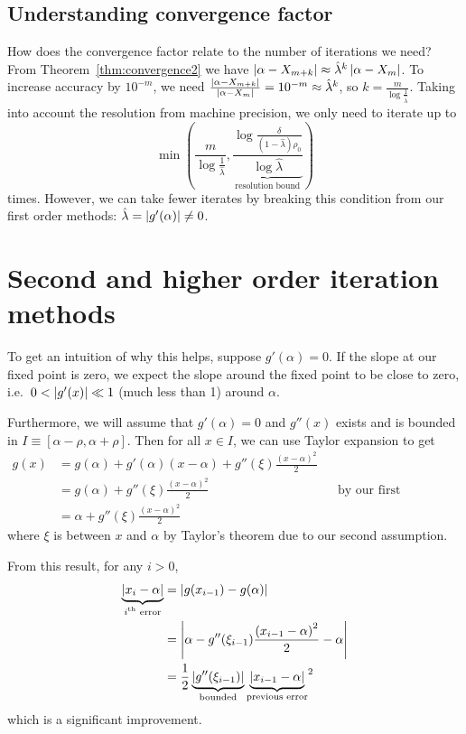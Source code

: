 \documentclass[12pt,letterpaper,DIV=11]{scrartcl}
\theoremstyle{plain}
\theoremstyle{definition}
\theoremstyle{remark}
\begin{document}
\subsection{Understanding convergence factor}
How does the convergence factor relate to the number of iterations we need?
From Theorem~\ref{thm:convergence2} we have $\left\lvert\alpha - X_{m + k}\right\rvert \approx \hat{\lambda}^k \left\lvert\alpha - X_m\right\rvert$.
To increase accuracy by $10^{-m}$, we need $\frac{\left\lvert\alpha - X_{m + k}\right\rvert}{\left\lvert\alpha - X_m\right\rvert} = 10^{-m} \approx \hat{\lambda}^k$, so $k = \frac{m}{\log \frac{1}{\hat{\lambda}}}$.
Taking into account the resolution from machine precision, we only need to iterate up to \begin{displaymath}
  \min\left( \frac{m}{\log \frac{1}{\hat{\lambda}}}, \underbrace{\frac{\log \frac{\delta}{(1 - \hat{\lambda}) \rho_0}}{\log \hat{\lambda}}}_\text{resolution bound} \right)
\end{displaymath} times.
However, we can take fewer iterates by breaking this condition from our first order methods: $\hat{\lambda} = \left\lvert g'(\alpha)\right\rvert \neq 0$.

\section{Second and higher order iteration methods}
To get an intuition of why this helps, suppose $g'(\alpha) = 0$.
If the slope at our fixed point is zero, we expect the slope around the fixed point to be close to zero, i.e.\ $0 < \left\lvert g'(x)\right\rvert \ll 1$ (much less than 1) around $\alpha$.

Furthermore, we will assume that $g'(\alpha) = 0$ and $g''(x)$ exists and is bounded in $I \equiv [\alpha - \rho, \alpha + \rho]$.
Then for all $x \in I$, we can use Taylor expansion to get \begin{align*}
  g(x) &= g(\alpha) + g'(\alpha)(x - \alpha) + g''(\xi) \frac{{(x - \alpha)}^2}{2} \\
       &= g(\alpha) + g''(\xi) \frac{{(x - \alpha)}^2}{2} && \text{by our first assumption} \\
       &= \alpha + g''(\xi) \frac{{(x - \alpha)}^2}{2}
\end{align*} where $\xi$ is between $x$ and $\alpha$ by Taylor's theorem due to our second assumption.

From this result, for any $i > 0$, \begin{align*}
  \underbrace{\left\lvert x_i - \alpha\right\rvert}_\text{$i$\textsuperscript{th} error} &= \left\lvert g(x_{i - 1}) - g(\alpha)\right\rvert \\
                                                                       &= \left\lvert\alpha - g''(\xi_{i - 1}) \frac{{(x_{i - 1} - \alpha)}^2}{2} - \alpha\right\rvert \\
                                                                       &= \frac{1}{2} \underbrace{\left\vert g''(\xi_{i - 1}) \right\vert}_\text{bounded} {\underbrace{\left\vert x_{i - 1} - \alpha \right\vert}_\text{previous error}}^2
\end{align*} which is a significant improvement.
\end{document}
